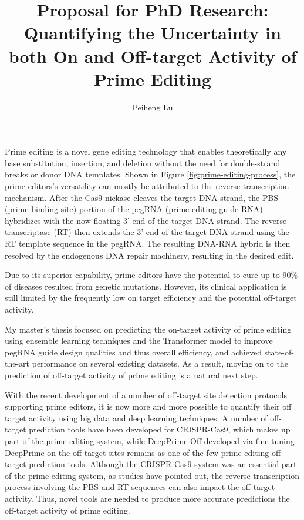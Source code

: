 \documentclass[a4,12pt]{article}
\title{Proposal for PhD Research: 
Quantifying the Uncertainty in both On and Off-target Activity of Prime Editing}
\author{Peiheng Lu}
\date{}
\begin{document}
\maketitle

Prime editing is a novel gene editing technology that enables theoretically any base substitution, insertion, and deletion without the need for double-strand breaks or donor DNA templates\cite{liudavidr.SearchreplaceGenomeEditing2019,liuPrimeEditingPrecise2023}. Shown in Figure \ref{fig:prime-editing-process}, the prime editors's versatility can mostly be attributed to the reverse transcription mechanism. After the Cas9 nickase cleaves the target DNA strand, the PBS (prime binding site) portion of the pegRNA (prime editing guide RNA) hybridizes with the now floating 3' end of the target DNA strand. The reverse transcriptase (RT) then extends the 3' end of the target DNA strand using the RT template sequence in the pegRNA. The resulting DNA-RNA hybrid is then resolved by the endogenous DNA repair machinery, resulting in the desired edit.

Due to its superior capability, prime editors have the potential to cure up to 90\% of diseases resulted from genetic mutations. However, its clinical application is still limited by the frequently low on target efficiency and the potential off-target activity\cite{zhaoPrimeEditingAdvances2023}.

My master's thesis focused on predicting the on-target activity of prime editing using ensemble learning techniques and the Transformer model to improve pegRNA guide design qualities and thus overall efficiency, and achieved state-of-the-art performance on several existing datasets. As a result, moving on to the prediction of off-target activity of prime editing is a natural next step.

With the recent development of a number of off-target site detection protocols supporting prime editors, it is now more and more possible to quantify their off target activity using big data and deep learning techniques\parencite{liangGenomewideProfilingPrime2023,
zhuTrackingseqRevealsHeterogeneity2024}.
A number of off-target prediction tools have been developed for CRISPR-Cas9, which makes up part of the prime editing system, while DeepPrime-Off developed via fine tuning DeepPrime on the off target sites remains as one of the few prime editing off-target prediction tools. Although the CRISPR-Cas9 system was an essential part of the prime editing system, as studies have pointed out, the reverse transcription process involving the PBS and RT sequences can also impact the off-target activity. Thus, novel tools are needed to produce more accurate predictions the off-target activity of prime editing\parencite{liangGenomewideProfilingPrime2023,yuPredictionEfficienciesDiverse2023}.
\end{document}
